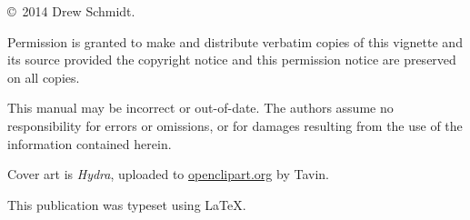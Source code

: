 \null
\vfill
\copyright\ 2014 Drew Schmidt.

Permission is granted to make and distribute verbatim copies of
this vignette and its source provided the copyright notice and
this permission notice are preserved on all copies.

This manual may be incorrect or out-of-date.  The authors assume
no responsibility for errors or omissions, or for damages resulting
from the use of the information contained herein.

Cover art is \textit{Hydra}, uploaded to \url{openclipart.org} by Tavin.

This publication was typeset using \LaTeX.
